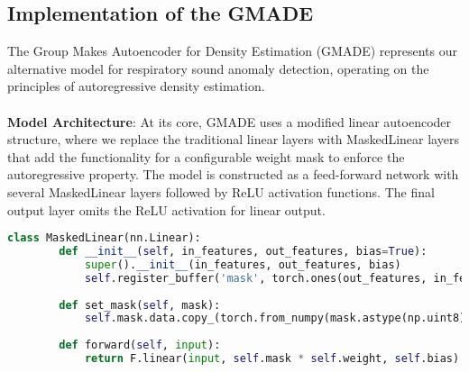 \subsection{Implementation of the GMADE}
The Group Makes Autoencoder for Density Estimation (GMADE) represents our alternative model for respiratory sound anomaly detection, operating on the principles of autoregressive density estimation.\\\\
\textbf{Model Architecture}: At its core, GMADE uses a modified linear autoencoder structure, where we replace the traditional linear layers with MaskedLinear layers that add the functionality for a configurable weight mask to enforce the autoregressive property. The model is constructed as a feed-forward network with several MaskedLinear layers followed by ReLU activation functions. The final output layer omits the ReLU activation for linear output.
\begin{lstlisting}[language=Python,caption={MaskedLinear PyTorch implementation as described by Karpathy, Andrej (2018)~\cite{githubMADE}}]
    class MaskedLinear(nn.Linear):    
        def __init__(self, in_features, out_features, bias=True):
            super().__init__(in_features, out_features, bias)        
            self.register_buffer('mask', torch.ones(out_features, in_features))
        
        def set_mask(self, mask):
            self.mask.data.copy_(torch.from_numpy(mask.astype(np.uint8).T))
            
        def forward(self, input):
            return F.linear(input, self.mask * self.weight, self.bias)
\end{lstlisting}

